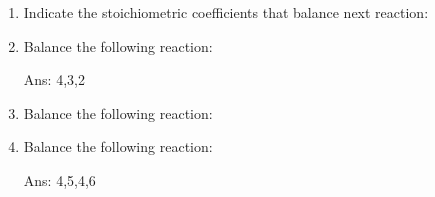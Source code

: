 \documentclass[main.tex]{subfiles}
\begin{document}
\begin{multicols*}{2}
\begin{enumerate}
\item Indicate the stoichiometric coefficients that balance next reaction:
\begin{center}\end{center}
\begin{enumerate}[label=(\alph*)]
\end{enumerate}

\item Balance the following reaction:
\begin{center}\end{center}
\begin{flushright}\small Ans: 4,3,2    \end{flushright}



\item Balance the following reaction:
\begin{center}\end{center}
\item Balance the following reaction:
\begin{center}\end{center}
\begin{flushright}\small Ans: 4,5,4,6    \end{flushright}


%


\end{enumerate}
\end{multicols*}
\end{document}

